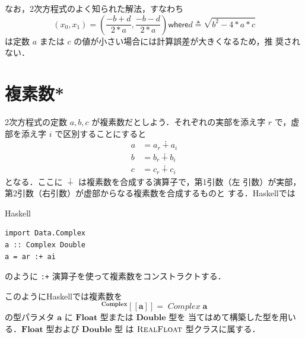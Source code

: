 \documentclass[a5paper,twoside,fleqn,draft]{jsbook}
\def\[{\left[\!\left[}
\def\]{\right]\!\right]}
\newcommand{\programminglanguage}[1]{\textsf{#1}}
\newcommand{\haskell}{\programminglanguage{Haskell}}
\newcommand{\code}[1]{\texttt{#1}}
\newenvironment{haskellcode}{\begin{itembox}[r]{\haskell}}{\end{itembox}}
\newcommand{\mKeyword}[1]{\mathsf{#1}} %
\newcommand{\mWhereKeyword}{\mKeyword{where}}
\DeclareMathOperator{\mComplexPlus}{\dotplus}
\DeclareMathOperator{\mLetEq}{\triangleq}
\newcommand{\mType}[1]{\mathbf{#1}}
\newcommand{\mFloatType}{\mType{Float}}
\newcommand{\mDoubleType}{\mType{Double}}
\newcommand{\mGenericTypeAssemble}[2]{{}^{\mType{#1}}\[\mType{#2}\]}
\newcommand{\mComplexType}[1]{\mGenericTypeAssemble{Complex}{#1}}
\newcommand{\mTypeConstructor}[1]{\textit{#1}}
\newcommand{\mGenericTypeClass}[1]{\textsc{#1}} %
\newcommand{\mRealFloatTypeClass}{\mGenericTypeClass{RealFloat}}
\newcommand{\mWhereIs}[2]{\mathbin{\mWhereKeyword}#1\mLetEq#2}
\begin{document}
なお，2次方程式のよく知られた解法，すなわち
\begin{equation}
  (x_0,x_1)=\left(\frac{-b+d}{2*a},\frac{-b-d}{2*a}\right)
  \mWhereIs{d}{\sqrt{b^2-4*a*c}}
\end{equation}
は定数 $a$ または $c$ の値が小さい場合には計算誤差が大きくなるため，推
奨されない．

\section{複素数*}

2次方程式の定数 $a,b,c$ が複素数だとしよう．それぞれの実部を添え字 $r$
で，虚部を添え字 $i$ で区別することにすると
\begin{align}
a&=a_r\mComplexPlus a_i\\
b&=b_r\mComplexPlus b_i\\
c&=c_r\mComplexPlus c_i
\end{align}
となる．ここに $\mComplexPlus$ は複素数を合成する演算子で，第1引数（左
  引数）が実部，第2引数（右引数）が虚部からなる複素数を合成するものと
する．\haskell では
\begin{haskellcode}
\begin{verbatim}
import Data.Complex
a :: Complex Double
a = ar :+ ai
\end{verbatim}
\end{haskellcode}
のように \code{:+} 演算子を使って複素数をコンストラクトする．

このように\haskell では複素数を
\begin{equation}
  \mComplexType{a}=\mathop{\mTypeConstructor{Complex}}\mType{a}
\end{equation}
の型パラメタ $\mType{a}$ に $\mFloatType$ 型または $\mDoubleType$ 型を
当てはめて構築した型を用いる．$\mFloatType$ 型および $\mDoubleType$ 型
は $\mRealFloatTypeClass$ 型クラスに属する．
\end{document}
